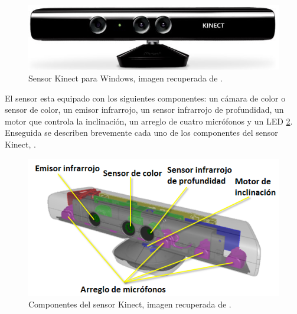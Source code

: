 \begin{figure}[h!]
\begin{center}
\includegraphics[scale=.60]{./Figures/Kinect.jpg}
\end{center}
\caption{Sensor Kinect para Windows, imagen recuperada de \footnotemark{}.}
\label{fig:KinectPic}
\end{figure} 


El sensor esta equipado con los siguientes componentes: un cámara de color o sensor de color, un emisor infrarrojo, un sensor infrarrojo de profundidad, un motor que controla la inclinación, un arreglo de cuatro micrófonos y un LED \ref{fig:KinectComponentes}. \\
Enseguida se describen brevemente cada uno de los componentes del sensor Kinect, \citep{Jana2013}. 
\begin{figure}[h!]
\begin{center}
\includegraphics[scale=.6]{./Figures/sensor.png}
\end{center}
\caption{Componentes del sensor Kinect, imagen recuperada de \footnotemark{}.} 
\label{fig:KinectComponentes}
\end{figure}   


